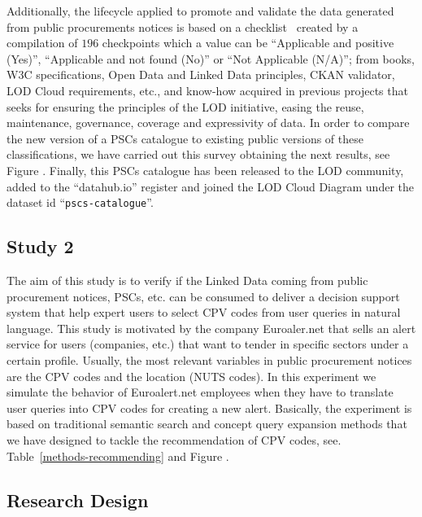 Additionally, the lifecycle applied to promote and validate the data generated from public procurements notices is based on 
a checklist~\cite{} created by a compilation of $196$ checkpoints which a value can be ``Applicable and positive (Yes)'', ``Applicable and not found (No)'' or ``Not Applicable (N/A)''; 
from books, W3C specifications, Open Data and Linked Data principles, CKAN validator, LOD Cloud requirements, etc., 
and know-how acquired in previous projects that seeks for ensuring the principles of the LOD initiative, 
easing the reuse, maintenance, governance, coverage and expressivity of data. 
In order to compare the new version of a PSCs catalogue to existing public versions of these classifications, 
we have carried out this survey obtaining the next results, see Figure . Finally, this PSCs catalogue has been released to the LOD community, added to the ``datahub.io'' 
register and joined the LOD Cloud Diagram under the dataset id ``\texttt{pscs-catalogue}''.


\subsection{Study 2}
The aim of this study is to verify if the Linked Data coming from public procurement notices, PSCs, etc. can be consumed to deliver a decision support system that help expert 
users to select CPV codes from user queries in natural language. This study is motivated by the company Euroaler.net that sells an alert service for users (companies, etc.) 
that want to tender in specific sectors under a certain profile. Usually, the most relevant variables in public procurement notices are the CPV codes and the 
location (NUTS codes). In this experiment we simulate the behavior of Euroalert.net employees when they have to translate user queries into CPV codes 
for creating a new alert. Basically, the experiment is based on traditional semantic search and concept query expansion methods that we have designed to 
tackle the recommendation of CPV codes, see. Table~\ref{methods-recommending} and Figure . 
\subsection{Research Design}


